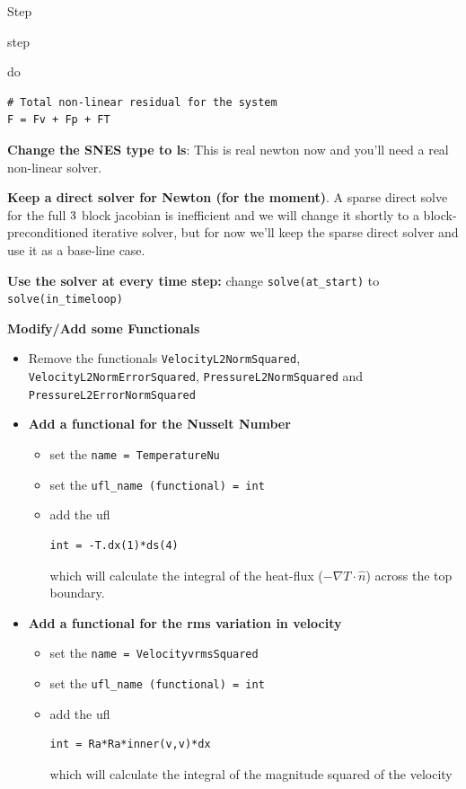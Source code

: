 \begin{steps}{Step}
\begin{steps}{step}
\begin{steps}{do}
\begin{lstlisting}[style=UFL]
# Total non-linear residual for the system
F = Fv + Fp + FT
    \end{lstlisting}
  \item \textbf{Change the SNES type to ls}:  This is real newton now
    and you'll need a real non-linear solver.
  \item \textbf{Keep a direct solver for Newton (for the moment)}.  A
    sparse direct solve for the full $3\time3$ block jacobian is
    inefficient and we will change it shortly to a
    block-preconditioned iterative solver, but for now we'll keep the
    sparse direct solver and use it as a base-line case.
    \end{steps}
  \item \textbf{Use the solver at every time step:} change
    \texttt{solve(at\_start)} to \texttt{solve(in\_timeloop)}
  \item \textbf{Modify/Add some Functionals}
    \begin{itemize}
    \item Remove the functionals \texttt{VelocityL2NormSquared},
      \texttt{VelocityL2NormErrorSquared},
      \texttt{PressureL2NormSquared} and
      \texttt{PressureL2ErrorNormSquared}
    \item \textbf{Add a functional for the Nusselt Number}
      \begin{itemize}
      \item set the \texttt{name = TemperatureNu}
      \item set the \texttt{ufl\_name (functional) = int}
      \item add the ufl
       \begin{lstlisting}[style=UFL]
         int = -T.dx(1)*ds(4)
       \end{lstlisting}
 which will calculate the integral of the heat-flux ($-\nabla T\cdot
 \hat{n}$) across the top boundary.
\end{itemize}
\item \textbf{Add a functional for the rms variation in velocity}
      \begin{itemize}
      \item set the \texttt{name = VelocityvrmsSquared}
      \item set the \texttt{ufl\_name (functional) = int}
      \item add the ufl
       \begin{lstlisting}[style=UFL]
int = Ra*Ra*inner(v,v)*dx
       \end{lstlisting}
 which will calculate the integral of the magnitude squared of the velocity

\end{itemize}
\end{itemize}
\end{steps}
\end{steps}

